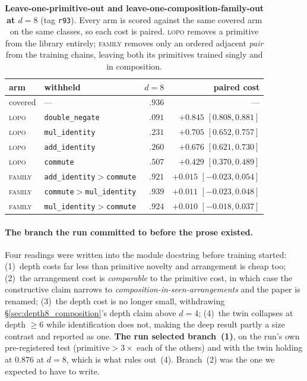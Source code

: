 \begin{table}[h]
\centering
\begin{threeparttable}
\footnotesize
\caption{\textbf{Leave-one-primitive-out and leave-one-composition-family-out at $d{=}8$} (tag \texttt{r93}). Every arm is scored against the same covered arm on the same classes, so each cost is paired. \textsc{lopo} removes a primitive from the library entirely; \textsc{family} removes only an ordered adjacent \emph{pair} from the training chains, leaving both its primitives trained singly and in composition.}
\label{tab:deep_novelty}
\small
\begin{tabular}{@{}l l rr@{}}
\toprule
arm & withheld & $d{=}8$ & paired cost \\
\midrule
covered & --- & $.936$ & --- \\
\midrule
\textsc{lopo} & \texttt{double\_negate} & $.091$ & $+0.845$ $[0.808,0.881]$ \\
\textsc{lopo} & \texttt{mul\_identity} & $.231$ & $+0.705$ $[0.652,0.757]$ \\
\textsc{lopo} & \texttt{add\_identity} & $.260$ & $+0.676$ $[0.621,0.730]$ \\
\textsc{lopo} & \texttt{commute} & $.507$ & $+0.429$ $[0.370,0.489]$ \\
\midrule
\textsc{family} & \texttt{add\_identity}${>}$\texttt{commute} & $.921$ & $+0.015$ $[-0.023,0.054]$ \\
\textsc{family} & \texttt{commute}${>}$\texttt{mul\_identity} & $.939$ & $+0.011$ $[-0.023,0.048]$ \\
\textsc{family} & \texttt{mul\_identity}${>}$\texttt{commute} & $.924$ & $+0.010$ $[-0.018,0.037]$ \\
\bottomrule
\end{tabular}
\end{threeparttable}
\end{table}

\paragraph{The branch the run committed to before the prose existed.} Four readings were written into the module docstring before training started: (1)~depth costs far less than primitive novelty and arrangement is cheap too; (2)~the arrangement cost is \emph{comparable} to the primitive cost, in which case the constructive claim narrows to \emph{composition-in-seen-arrangements} and the paper is renamed; (3)~the depth cost is no longer small, withdrawing \S\ref{sec:depth8_composition}'s depth claim above $d{=}4$; (4)~the twin collapses at depth ${\geq}6$ while identification does not, making the deep result partly a size contrast and reported as one. \textbf{The run selected branch~(1)}, on the run's own pre-registered test ($\text{primitive} > 3\times$ each of the others) and with the twin holding at $0.876$ at $d{=}8$, which is what rules out~(4). Branch~(2) was the one we expected to have to write.

